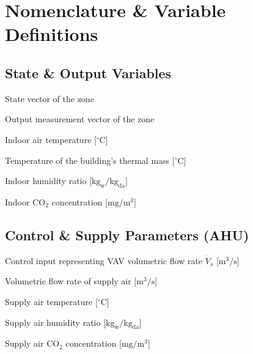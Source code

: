 \documentclass[12pt, a4paper]{article}
\begin{document}
	\newpage
	
	
	
	

	\newpage
	
	\appendix
	\section{Nomenclature \& Variable Definitions}
	
	\subsection*{State \& Output Variables}
	\begin{description}[align=left, labelwidth=2.5cm, leftmargin=!]
		\item[$x$] State vector of the zone
		\item[$y$] Output measurement vector of the zone
		\item[$T_{\mathrm{in}}$] Indoor air temperature [$^\circ\mathrm{C}$]
		\item[$T_m$] Temperature of the building's thermal mass [$^\circ\mathrm{C}$]
		\item[$W_{\mathrm{in}}$] Indoor humidity ratio [$\mathrm{kg_w/kg_{da}}$]
		\item[$C_{\mathrm{in}}$] Indoor $\mathrm{CO}_2$ concentration [$\mathrm{mg/m^3}$]
	\end{description}
	
	\subsection*{Control \& Supply Parameters (AHU)}
	\begin{description}[align=left, labelwidth=2.5cm, leftmargin=!]
		\item[$u$] Control input representing VAV volumetric flow rate $\dot{V}_s$ [$\mathrm{m^3/s}$]
		\item[$\dot{V}_s$] Volumetric flow rate of supply air [$\mathrm{m^3/s}$]
		\item[$T_s$] Supply air temperature [$^\circ\mathrm{C}$]
		\item[$W_s$] Supply air humidity ratio [$\mathrm{kg_w/kg_{da}}$]
		\item[$C_s$] Supply air $\mathrm{CO}_2$ concentration [$\mathrm{mg/m^3}$]
	\end{description}
	
\end{document}
